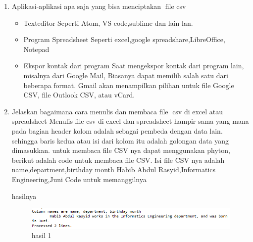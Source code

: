 \begin {enumerate}
\item Aplikasi-aplikasi apa saja yang bisa menciptakan file csv
\begin{itemize}
	\item Texteditor
	Seperti Atom, VS code,sublime dan lain lan.
	\item Program Spreadsheet
	Seperti excel,google spreadshare,LibreOffice, Notepad
	\item Ekspor kontak dari program
	Saat mengekspor kontak dari program lain, misalnya dari Google Mail, Biasanya dapat memilih salah satu dari beberapa format.
	Gmail akan menampilkan pilihan untuk file Google CSV, file Outlook CSV, atau vCard.
\end{itemize}
\item Jelaskan bagaimana cara menulis dan membaca file csv di excel atau spreadsheet\newline
Menulis file csv di excel dan spreadsheet hampir sama yang mana pada bagian header kolom adalah sebagai pembeda dengan data lain.
sehingga baris kedua atau isi dari kolom itu adalah golongan data yang dimasukkan.
untuk membaca file CSV nya dapat menggunakan phyton, berikut adalah code untuk membaca file CSV.\newline
Isi file CSV nya adalah \newline
name,department,birthday month \newline
Habib Abdul Rasyid,Informatics Engineering,Juni \newline
Code untuk memanggilnya 

hasilnya

\begin{figure}[h]
\centering
\includegraphics[scale=0.5]{figures/habib/hasil1.png}
\caption{hasil 1}
\label{fig:csv}
\end{figure}


\end{enumerate}
